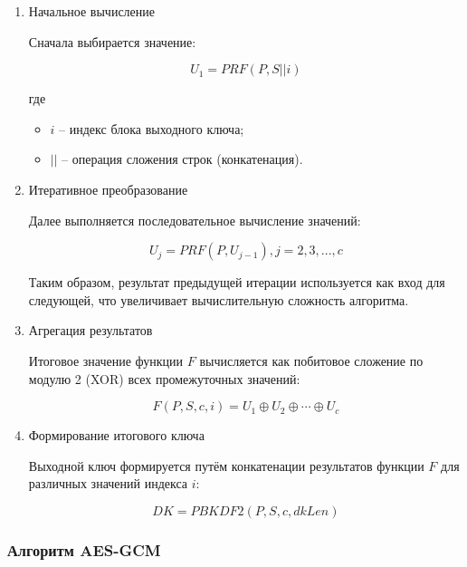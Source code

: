 \documentclass[14pt, a4paper]{extarticle}
\begin{document}
	\begin{enumerate}
	
	\item Начальное вычисление
	
	Сначала выбирается значение:
	
	\begin{equation}
		U_{1} = PRF(P,S||i)
	\end{equation}
	
	где 
	
	\begin{itemize}
	\item $i$ -- индекс блока выходного ключа;
	\item $||$ -- операция сложения строк (конкатенация).
	\end{itemize}
	
	\item Итеративное преобразование
	
	Далее выполняется последовательное вычисление значений:
	
	\begin{equation}
		U_{j} = PRF(P,U_{j-1}), j = 2,3,...,c
	\end{equation}
	
	Таким образом, результат предыдущей итерации используется как вход для следующей, что увеличивает вычислительную сложность алгоритма.
	
	\item Агрегация результатов
	
	Итоговое значение функции $F$ вычисляется как побитовое сложение по модулю 2 (XOR) всех промежуточных значений:
	
	\begin{equation}
		F(P,S,c,i) = U_1 \oplus U_2 \oplus \cdots \oplus U_c
	\end{equation}
	
	\item Формирование итогового ключа
	
	Выходной ключ формируется путём конкатенации результатов функции $F$ для различных значений индекса $i$:
	
	\begin{equation}
		DK = PBKDF2(P,S,c,dkLen)
	\end{equation}
	
	\end{enumerate}
	
	\subsubsection{Алгоритм AES-GCM}
	
\end{document}
